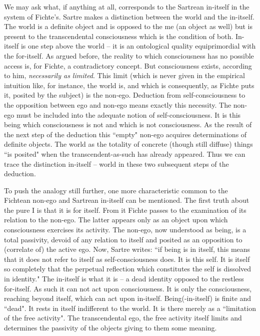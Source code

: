 We may ask what, if anything at all, corresponds to the Sartrean in-itself in the system of 
Fichte's. Sartre makes a distinction between the world and the in-itself. The world is a definite object and is 
opposed to the me (an object as well) but is present to the transcendental consciousness which is the condition of 
both. In-itself is one step above the world -- it is an ontological quality equiprimordial with the for-itself. As argued 
before, the reality to which consciousness has no possible access is, for Fichte, a contradictory concept. But 
consciousness exists, according to him, {\em necessarily as limited}. This limit (which is never given in the empirical 
intuition like, for instance, the world is, and which is consequently, as Fichte puts it, posited by the subject) is the 
non-ego. Deduction from self-consciousness to the opposition between ego and non-ego means exactly this 
necessity. The non-ego must be included into the adequate notion of self-consciousness. It is this being which 
consciousness is not and which is not consciousness. As the result of the next step of the deduction this ``empty" 
non-ego acquires determinations of definite objects. The world as the totality of concrete (though still diffuse) 
things ``is posited" when the transcendent-as-such has already appeared. Thus we can trace the distinction in-itself -- world in these two subsequent steps of the deduction.  

To push the analogy still further, one more characteristic common to the Fichtean non-ego and Sartrean in-itself 
can be mentioned. The first truth about the pure I is that it is for itself. From it Fichte passes to the examination 
of its relation to the non-ego. The latter appears only as an object upon which consciousness exercises its activity. 
The non-ego,  now understood as being, is a total passivity, devoid of any relation to itself and posited as an 
opposition to (correlate of) the active ego. Now, Sartre writes: ``if being is in itself, this means that it does not 
refer to itself as self-consciousness does. It is this self. It is itself so completely that the perpetual reflection which 
constitutes the self is dissolved in identity." \cite{BN}   The in-itself is what it is -- a dead identity opposed to the restless for-itself. As such it can not act upon consciousness. It is only the consciousness, reaching beyond itself, which can 
act upon in-itself. Being(-in-itself) is finite and ``dead". It rests in itself indifferent to the world. It is there merely as 
a ``limitation of the free activity". The transcendental ego, the free activity itself limits and determines the passivity 
of the objects giving to them some meaning. 

